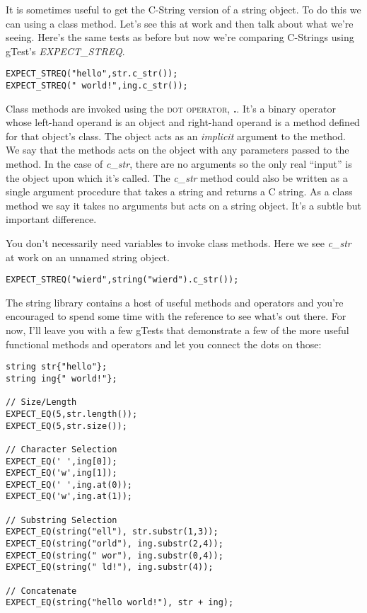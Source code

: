 \documentclass[]{tufte-handout}
\begin{document}
It is sometimes useful to get the C-String version of a string object. To do this we can using a class method. Let's see this at work and then talk about what we're seeing. Here's the same tests as before but now we're comparing C-Strings using gTest's \textit{EXPECT\_STREQ}.
\begin{verbatim}
EXPECT_STREQ("hello",str.c_str());
EXPECT_STREQ(" world!",ing.c_str());
\end{verbatim}
Class methods are invoked using the \textsc{dot operator}, \textbf{.}.  It's a binary operator whose left-hand operand is an object and right-hand operand is a method defined for that object's class. The object acts as an \textit{implicit} argument to the method. We say that the methods acts on the object with any parameters passed to the method. In the case of \textit{c\_str}, there are no arguments so the only real ``input'' is the object upon which it's called.  The \textit{c\_str} method could also be written as a single argument procedure that takes a string and returns a C string. As a class method we say it takes no arguments but acts on a string object. It's a subtle but important difference. 

You don't necessarily need variables to invoke class methods.  Here we see \textit{c\_str} at work on an unnamed string object.
\begin{verbatim}
EXPECT_STREQ("wierd",string("wierd").c_str());
\end{verbatim}

The string library contains a host of useful methods and operators and you're encouraged to spend some time with the reference to see what's out there. For now, I'll leave you with a few gTests that demonstrate a few of the more useful functional methods and operators and let you connect the dots on those:
\begin{verbatim}
string str{"hello"};
string ing{" world!"};

// Size/Length
EXPECT_EQ(5,str.length());
EXPECT_EQ(5,str.size());

// Character Selection
EXPECT_EQ(' ',ing[0]);
EXPECT_EQ('w',ing[1]);
EXPECT_EQ(' ',ing.at(0));
EXPECT_EQ('w',ing.at(1));

// Substring Selection
EXPECT_EQ(string("ell"), str.substr(1,3));
EXPECT_EQ(string("orld"), ing.substr(2,4));
EXPECT_EQ(string(" wor"), ing.substr(0,4));
EXPECT_EQ(string(" ld!"), ing.substr(4));

// Concatenate 
EXPECT_EQ(string("hello world!"), str + ing);
\end{verbatim} 
\end{document}
